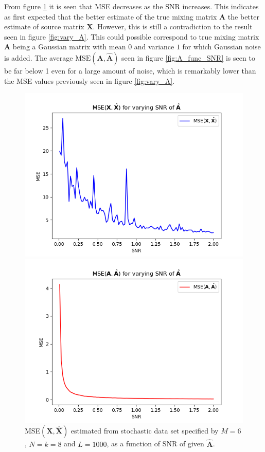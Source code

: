 From figure \ref{fig:X_func_SNR} it is seen that MSE decreases as the SNR increases. 
This indicates as first expected that the better estimate of the true mixing matrix $\mathbf{A}$ the better estimate of source matrix $\mathbf{X}$. 
However, this is still a contradiction to the result seen in figure \ref{fig:vary_A}. 
This could possible correspond to true mixing matrix $\mathbf{A}$ being a Gaussian matrix with mean $0$ and variance $1$ for which Gaussian noise is added. 
The average $\text{MSE}(\mathbf{A}, \hat{\mathbf{A}})$ seen in figure \ref{fig:A_func_SNR} is seen to be far below 1 even for a large amount of noise, which is remarkably lower than the MSE values previously seen in figure \ref{fig:vary_A}.  
\begin{figure}[H]
\begin{widepage}
    \begin{minipage}[t]{.45\textwidth}
    	\centering
		\includegraphics[scale=0.5]{figures/ch_6/X_func_SNR.png}
		\caption{MSE$(\mathbf{X},\hat{\mathbf{X}})$ estimated from stochastic data set specified by $M = 6$, $N = k = 8$ and $L = 1000$, as a function of SNR of given $\hat{\mathbf{A}}$.}
		\label{fig:X_func_SNR}
    \end{minipage} 
    \hspace{0.5cm}
    \begin{minipage}[t]{.45\textwidth}
        \centering
		\includegraphics[scale=0.5]{figures/ch_6/A_func_SNR.png}

\end{minipage}
\end{widepage}
\end{figure}
